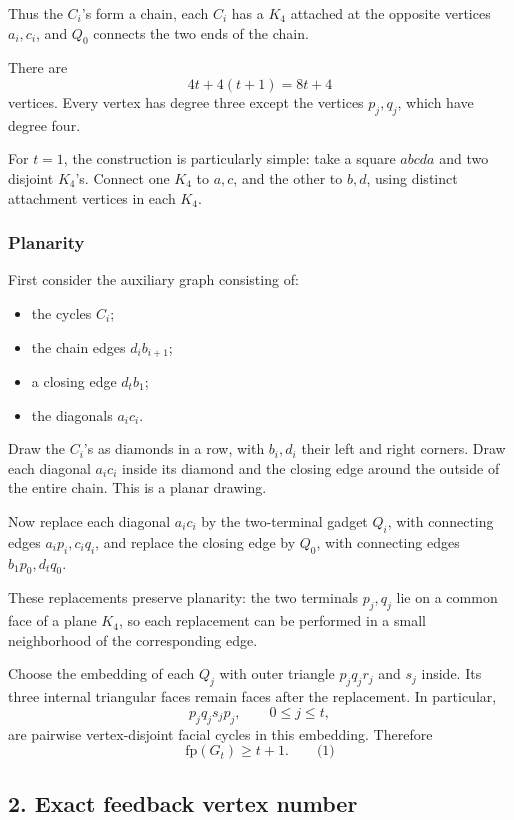 \documentclass[
  11pt,
  a4paper,
]{article}
\providecommand{\tightlist}{%
  \setlength{\itemsep}{0pt}\setlength{\parskip}{0pt}}
\begin{document}
Thus the \(C_i\)'s form a chain, each \(C_i\) has a \(K_4\) attached at
the opposite vertices \(a_i,c_i\), and \(Q_0\) connects the two ends of
the chain.

There are \[
4t+4(t+1)=8t+4
\] vertices. Every vertex has degree three except the vertices
\(p_j,q_j\), which have degree four.

For \(t=1\), the construction is particularly simple: take a square
\(abcd a\) and two disjoint \(K_4\)'s. Connect one \(K_4\) to \(a,c\),
and the other to \(b,d\), using distinct attachment vertices in each
\(K_4\).

\subsubsection{Planarity}\label{planarity}

First consider the auxiliary graph consisting of:

\begin{itemize}
\tightlist
\item
  the cycles \(C_i\);
\item
  the chain edges \(d_i b_{i+1}\);
\item
  a closing edge \(d_tb_1\);
\item
  the diagonals \(a_ic_i\).
\end{itemize}

Draw the \(C_i\)'s as diamonds in a row, with \(b_i,d_i\) their left and
right corners. Draw each diagonal \(a_ic_i\) inside its diamond and the
closing edge around the outside of the entire chain. This is a planar
drawing.

Now replace each diagonal \(a_ic_i\) by the two-terminal gadget \(Q_i\),
with connecting edges \(a_ip_i,c_iq_i\), and replace the closing edge by
\(Q_0\), with connecting edges \(b_1p_0,d_tq_0\).

These replacements preserve planarity: the two terminals \(p_j,q_j\) lie
on a common face of a plane \(K_4\), so each replacement can be
performed in a small neighborhood of the corresponding edge.

Choose the embedding of each \(Q_j\) with outer triangle \(p_jq_jr_j\)
and \(s_j\) inside. Its three internal triangular faces remain faces
after the replacement. In particular, \[
p_jq_js_jp_j,\qquad 0\le j\le t,
\] are pairwise vertex-disjoint facial cycles in this embedding.
Therefore \[
\mathrm{fp}(G_t)\ge t+1. \qquad\text{(1)}
\]

\subsection{2. Exact feedback vertex
number}\label{exact-feedback-vertex-number}
\end{document}
